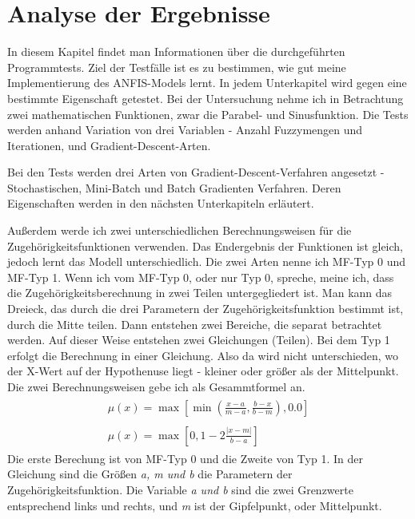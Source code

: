 \chapter{Analyse der Ergebnisse}

In diesem Kapitel findet man Informationen über die durchgeführten Programmtests. Ziel der Testfälle ist es zu bestimmen, wie gut meine Implementierung des ANFIS-Models lernt. In jedem Unterkapitel wird gegen eine bestimmte Eigenschaft getestet. Bei der Untersuchung nehme ich in Betrachtung zwei mathematischen Funktionen, zwar die Parabel- und Sinusfunktion. Die Tests werden anhand Variation von drei Variablen - Anzahl Fuzzymengen und Iterationen, und Gradient-Descent-Arten. 

Bei den Tests werden drei Arten von Gradient-Descent-Verfahren angesetzt - Stochastischen, Mini-Batch und Batch Gradienten Verfahren. Deren Eigenschaften werden in den nächsten Unterkapiteln erläutert. 

Außerdem werde ich zwei unterschiedlichen Berechnungsweisen für die Zugehörigkeitsfunktionen verwenden. Das Endergebnis der Funktionen ist gleich, jedoch lernt das Modell unterschiedlich. Die zwei Arten nenne ich MF-Typ 0 und MF-Typ 1. Wenn ich vom MF-Typ 0, oder nur Typ 0, spreche, meine ich, dass die Zugehörigkeitsberechnung in zwei Teilen untergegliedert ist. Man kann das Dreieck, das durch die drei Parametern der Zugehörigkeitsfunktion bestimmt ist, durch die Mitte teilen. Dann entstehen zwei Bereiche, die separat betrachtet werden. Auf dieser Weise entstehen zwei Gleichungen (Teilen). Bei dem Typ 1 erfolgt die Berechnung in einer Gleichung. Also da wird nicht unterschieden, wo der X-Wert auf der Hypothenuse liegt - kleiner oder größer als der Mittelpunkt. Die zwei Berechnungsweisen gebe ich als Gesammtformel an.
\begin{align}
	\begin{split}\label{mf_typ0}
		\mu(x) = \max[\min(\frac{x - a}{m - a}, \frac{b - x}{b - m}), 0.0]
	\end{split}\\
	\begin{split}\label{mf_typ1} 
		\mu(x) = \max[0, 1 - 2\frac{\lvert x - m\rvert}{b - a}]
	\end{split} 
\end{align}
Die erste Berechung ist von MF-Typ 0 und die Zweite von Typ 1. In der Gleichung sind die Größen \textit{a, m und b} die Parametern der Zugehörigkeitsfunktion. Die Variable \textit{a und b} sind die zwei Grenzwerte entsprechend links und rechts, und \textit{m} ist der Gipfelpunkt, oder Mittelpunkt.

